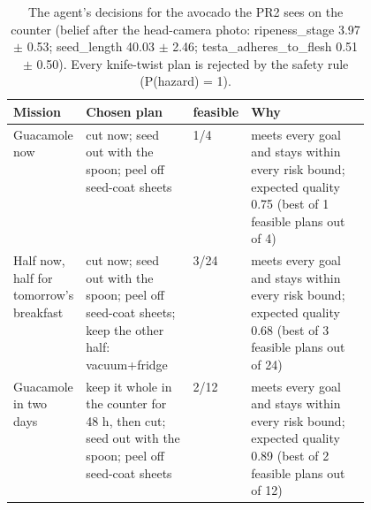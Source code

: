 \documentclass[10.5pt,a4paper]{article}
\begin{document}
\begin{table}[htbp]\centering\scriptsize\caption{The agent's decisions for the avocado the PR2 sees on the counter (belief after the head-camera photo: ripeness\_stage 3.97 $\pm$ 0.53; seed\_length 40.03 $\pm$ 2.46; testa\_adheres\_to\_flesh 0.51 $\pm$ 0.50). Every knife-twist plan is rejected by the safety rule (P(hazard) = 1).}
\begin{tabularx}{\linewidth}{@{}p{0.17\linewidth}p{0.3\linewidth}lX@{}}\toprule Mission & Chosen plan & feasible & Why \\\midrule
Guacamole now & cut now; seed out with the spoon; peel off seed-coat sheets & 1/4 & meets every goal and stays within every risk bound; expected quality 0.75 (best of 1 feasible plans out of 4) \\
Half now, half for tomorrow's breakfast & cut now; seed out with the spoon; peel off seed-coat sheets; keep the other half: vacuum+fridge & 3/24 & meets every goal and stays within every risk bound; expected quality 0.68 (best of 3 feasible plans out of 24) \\
Guacamole in two days & keep it whole in the counter for 48 h, then cut; seed out with the spoon; peel off seed-coat sheets & 2/12 & meets every goal and stays within every risk bound; expected quality 0.89 (best of 2 feasible plans out of 12) \\\bottomrule\end{tabularx}\end{table}
\end{document}
